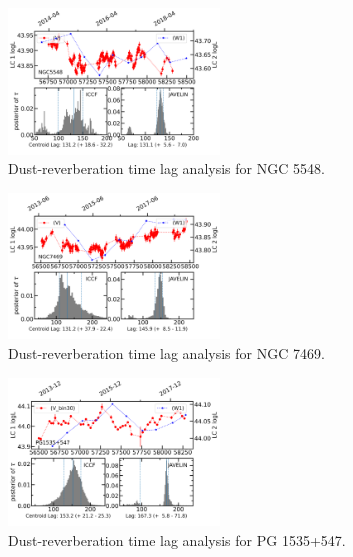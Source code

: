 \begin{figure}
\centering
	\includegraphics[width=0.5\textwidth]{pic/NGC5548lag.png}
    \caption{Dust-reverberation time lag analysis for NGC 5548. }
    \label{fig:lag_NGC5548}
\end{figure}

\begin{figure}
\centering
	\includegraphics[width=0.5\textwidth]{pic/NGC7469lag.png}
    \caption{Dust-reverberation time lag analysis for NGC 7469. }
    \label{fig:lag_NGC7469}
\end{figure}
\begin{figure}
\centering
	\includegraphics[width=0.5\textwidth]{pic/PG1535p547lag1.png}
    \caption{Dust-reverberation time lag analysis for PG 1535+547. }
    \label{fig:lag_PG1535}
\end{figure}